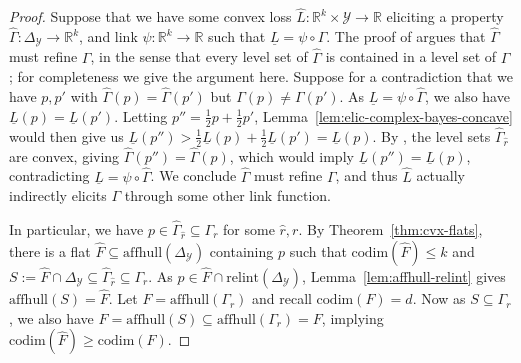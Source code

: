 \documentclass{article}
\newcommand{\reals}{\mathbb{R}}
\newcommand{\simplex}{\Delta_\Y}
\newcommand{\relint}[1]{\mathrm{relint}(#1)}
\newcommand{\codim}{\mathrm{codim}}
\newcommand{\affhull}{\mathrm{affhull}}
\newcommand{\Y}{\mathcal{Y}}
\newcommand{\lbar}{\underline{L}} %
\newcommand{\iden}{\mathrm{iden}}
\begin{document}
\bayesrisklowerbound*
\begin{proof}
	Suppose that we have some convex loss $\hat L:\reals^k\times\Y\to\reals$ eliciting a property $\hat\Gamma:\simplex\to\reals^k$, and link $\psi : \reals^k \to \reals$ such that $\lbar = \psi \circ \hat\Gamma$.
	The proof of \citet[Theorem 4]{frongillo2018elicitation} argues that $\hat\Gamma$ must refine $\Gamma$, in the sense that every level set of $\hat\Gamma$ is contained in a level set of $\Gamma$; for completeness we give the argument here.
	Suppose for a contradiction that we have $p,p'$ with $\hat\Gamma(p)=\hat\Gamma(p')$ but $\Gamma(p) \neq \Gamma(p')$.
	As $\lbar = \psi \circ \hat\Gamma$, we also have $\lbar(p) = \lbar(p')$.
	Letting $p'' = \tfrac 1 2 p +  \tfrac 1 2 p'$, Lemma~\ref{lem:elic-complex-bayes-concave} would then give us $\lbar(p'') >  \tfrac 1 2 \lbar(p) +  \tfrac 1 2 \lbar(p') = \lbar(p)$.
	By \citet{osband1985providing}, the level sets $\hat\Gamma_{\hat r}$ are convex, giving $\hat\Gamma(p'') = \hat\Gamma(p)$, which would imply $\lbar(p'')=\lbar(p)$, contradicting $\lbar = \psi \circ \hat\Gamma$.
	We conclude $\hat\Gamma$ must refine $\Gamma$, and thus $\hat L$ actually indirectly elicits $\Gamma$ through some other link function.
	
	In particular, we have $p \in \hat \Gamma_{\hat r} \subseteq \Gamma_r$ for some $\hat r, r$.
	By Theorem~\ref{thm:cvx-flats}, there is a flat $\hat F \subseteq \affhull(\simplex)$ containing $p$ such that $\codim(\hat F) \leq k$ and $S := \hat F \cap \simplex \subseteq \hat\Gamma_{\hat r} \subseteq \Gamma_r$.
	As $p\in \hat F\cap\relint\simplex$, Lemma~\ref{lem:affhull-relint} gives $\affhull(S) = \hat F$.
	Let $F = \affhull(\Gamma_r)$ and recall $\codim(F)=d$.
	Now as $S \subseteq \Gamma_r$, we also have $\hat F = \affhull(S) \subseteq \affhull(\Gamma_r) = F$,
	implying $\codim(\hat F) \geq \codim(F)$.
	

\end{proof}
\end{document}
